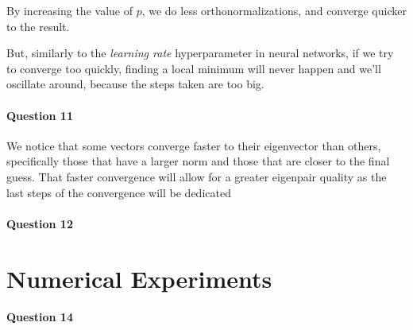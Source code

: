 \documentclass{article}
\begin{document}
By increasing the value of $p$, we do less orthonormalizations, and converge quicker to the result.

But, similarly to the \emph{learning rate} hyperparameter in neural networks, if we try to converge too quickly, finding a local minimum will never happen and we'll oscillate around, because the steps taken are too big.

\paragraph{Question 11}

We notice that some vectors converge faster to their eigenvector than others, specifically those that have a larger norm and those that are closer to the final guess. That faster convergence will allow for a greater eigenpair quality as the last steps of the convergence will be dedicated

\paragraph{Question 12}



\section{Numerical Experiments}

\paragraph{Question 14}
\end{document}
